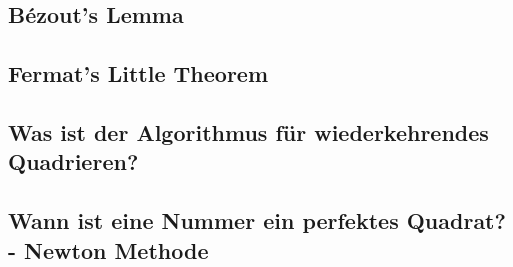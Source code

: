 \documentclass[german,12pt,a4paper]{article}
\begin{document}
\subsection{Bézout's Lemma}
\subsection{Fermat's Little Theorem}
\subsection{Was ist der Algorithmus für wiederkehrendes Quadrieren?}
\subsection{Wann ist eine Nummer ein perfektes Quadrat? - Newton Methode}
\newpage

\section*{}
\printbibliography

\newpage

\listoftables
{}
\newpage

\listoffigures
{}
\end{document}
